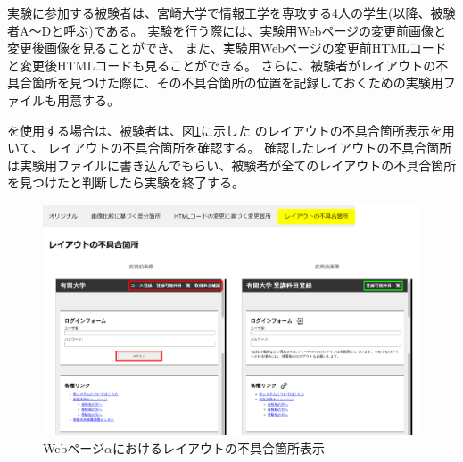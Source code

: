 実験に参加する被験者は、宮崎大学で情報工学を専攻する4人の学生(以降、被験者A～Dと呼ぶ)である。
実験を行う際には、実験用Webページの変更前画像と変更後画像を見ることができ、
また、実験用Webページの変更前HTMLコードと変更後HTMLコードも見ることができる。
さらに、被験者がレイアウトの不具合箇所を見つけた際に、その不具合箇所の位置を記録しておくための実験用ファイルも用意する。
\par
\toolName を使用する場合は、被験者は、図\ref{fig:test1_subeffect}に示した
\toolName のレイアウトの不具合箇所表示を用いて、
レイアウトの不具合箇所を確認する。
確認したレイアウトの不具合箇所は実験用ファイルに書き込んでもらい、被験者が全てのレイアウトの不具合箇所を見つけたと判断したら実験を終了する。
\begin{figure}[tp]
    \centering
    \includegraphics[width=1.0\textwidth]{image/5/new_effect.png}
    \caption{Webページ$\alpha$におけるレイアウトの不具合箇所表示}
    \label{fig:test1_subeffect}
\end{figure}

